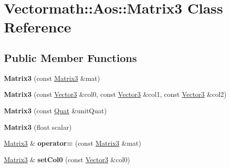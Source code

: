 \hypertarget{classVectormath_1_1Aos_1_1Matrix3}{}\section{Vectormath\+:\+:Aos\+:\+:Matrix3 Class Reference}
\label{classVectormath_1_1Aos_1_1Matrix3}
\subsection*{Public Member Functions}
\begin{DoxyCompactItemize}
\item 
\mbox{\label{classVectormath_1_1Aos_1_1Matrix3_a70ed1efea22260aaf3feb09bfdae1cd1}} 
{\bfseries Matrix3} (const \hyperlink{classVectormath_1_1Aos_1_1Matrix3}{Matrix3} \&mat)
\item 
\mbox{\label{classVectormath_1_1Aos_1_1Matrix3_ae2f8a0046818a2cd2d2c4be443e73cb1}} 
{\bfseries Matrix3} (const \hyperlink{classVectormath_1_1Aos_1_1Vector3}{Vector3} \&col0, const \hyperlink{classVectormath_1_1Aos_1_1Vector3}{Vector3} \&col1, const \hyperlink{classVectormath_1_1Aos_1_1Vector3}{Vector3} \&col2)
\item 
\mbox{\label{classVectormath_1_1Aos_1_1Matrix3_adc65495cc7d3528f539437ff760aee77}} 
{\bfseries Matrix3} (const \hyperlink{classVectormath_1_1Aos_1_1Quat}{Quat} \&unit\+Quat)
\item 
\mbox{\label{classVectormath_1_1Aos_1_1Matrix3_acbf606567d34e43be0b7a90544bd5153}} 
{\bfseries Matrix3} (float scalar)
\item 
\mbox{\label{classVectormath_1_1Aos_1_1Matrix3_ac44263902125a12ac01203e44b3fe32f}} 
\hyperlink{classVectormath_1_1Aos_1_1Matrix3}{Matrix3} \& {\bfseries operator=} (const \hyperlink{classVectormath_1_1Aos_1_1Matrix3}{Matrix3} \&mat)
\item 
\mbox{\label{classVectormath_1_1Aos_1_1Matrix3_a6f1fb862918de7039479584350fcb436}} 
\hyperlink{classVectormath_1_1Aos_1_1Matrix3}{Matrix3} \& {\bfseries set\+Col0} (const \hyperlink{classVectormath_1_1Aos_1_1Vector3}{Vector3} \&col0)

\end{DoxyCompactItemize}
